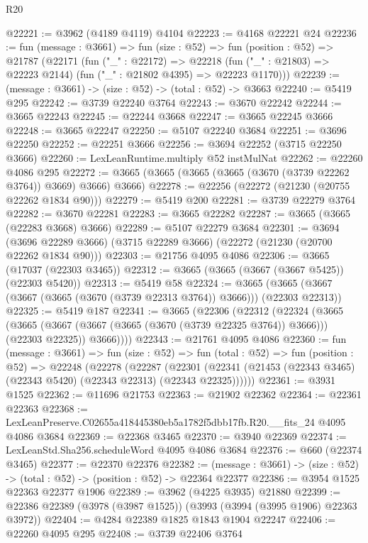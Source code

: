 \begin{lexlean}{R20}
\begin{coremodule}
@22221 := @3962 (@4189 @4119) @4104
@22223 := @4168 @22221 @24
@22236 := fun (message : @3661) =>
  fun (size : @52) =>
  fun (position : @52) =>
  @21787
    (@22171
      (fun ("_" : @22172) =>
      @22218 (fun ("_" : @21803) => @22223 @2144) (fun ("_" : @21802 @4395) => @22223 @1170)))
@22239 := (message : @3661) -> (size : @52) -> (total : @52) -> @3663
@22240 := @5419 @295
@22242 := @3739 @22240 @3764
@22243 := @3670 @22242
@22244 := @3665 @22243
@22245 := @22244 @3668
@22247 := @3665 @22245 @3666
@22248 := @3665 @22247
@22250 := @5107 @22240 @3684
@22251 := @3696 @22250
@22252 := @22251 @3666
@22256 := @3694 @22252 (@3715 @22250 @3666)
@22260 := LexLeanRuntime.multiply @52 instMulNat
@22262 := @22260 @4086 @295
@22272 := @3665 (@3665 (@3665 (@3665 (@3670 (@3739 @22262 @3764)) @3669) @3666) @3666)
@22278 := @22256 (@22272 (@21230 (@20755 @22262 @1834 @90)))
@22279 := @5419 @200
@22281 := @3739 @22279 @3764
@22282 := @3670 @22281
@22283 := @3665 @22282
@22287 := @3665 (@3665 (@22283 @3668) @3666)
@22289 := @5107 @22279 @3684
@22301 := @3694
    (@3696 @22289 @3666)
    (@3715 @22289 @3666)
    (@22272 (@21230 (@20700 @22262 @1834 @90)))
@22303 := @21756 @4095 @4086
@22306 := @3665 (@17037 (@22303 @3465))
@22312 := @3665 (@3665 (@3667 (@3667 @5425)) (@22303 @5420))
@22313 := @5419 @58
@22324 := @3665 (@3665 (@3667 (@3667 (@3665 (@3670 (@3739 @22313 @3764)) @3666))) (@22303 @22313))
@22325 := @5419 @187
@22341 := @3665
    (@22306
      (@22312
        (@22324
          (@3665
            (@3665 (@3667 (@3667 (@3665 (@3670 (@3739 @22325 @3764)) @3666))) (@22303 @22325))
            @3666))))
@22343 := @21761 @4095 @4086
@22360 := fun (message : @3661) =>
  fun (size : @52) =>
  fun (total : @52) =>
  fun (position : @52) =>
  @22248
    (@22278
      (@22287
        (@22301 (@22341 (@21453 (@22343 @3465) (@22343 @5420) (@22343 @22313) (@22343 @22325))))))
@22361 := @3931 @1525
@22362 := @11696 @21753
@22363 := @21902 @22362
@22364 := @22361 @22363
@22368 := LexLeanPreserve.C02655a418445380eb5a1782f5dbb17fb.R20.__fits_24 @4095 @4086 @3684
@22369 := @22368 @3465
@22370 := @3940 @22369
@22374 := LexLeanStd.Sha256.scheduleWord @4095 @4086 @3684
@22376 := @660 (@22374 @3465)
@22377 := @22370 @22376
@22382 := (message : @3661) -> (size : @52) -> (total : @52) -> (position : @52) -> @22364 @22377
@22386 := @3954 @1525 @22363 @22377 @1906
@22389 := @3962 (@4225 @3935) @21880
@22399 := @22386 @22389 (@3978 (@3987 @1525)) (@3993 (@3994 (@3995 @1906) @22363 @3972))
@22404 := @4284 @22389 @1825 @1843 @1904 @22247
@22406 := @22260 @4095 @295
@22408 := @3739 @22406 @3764

\end{coremodule}
\end{lexlean}
